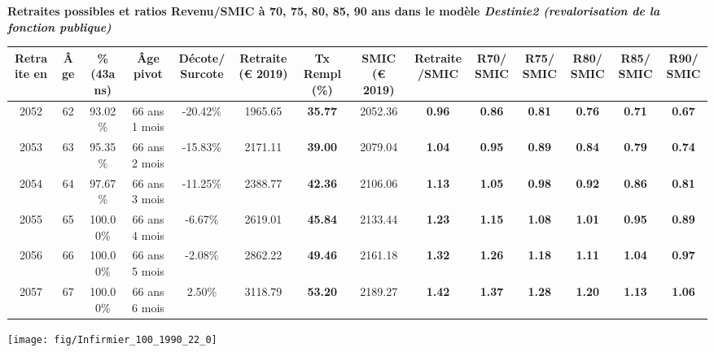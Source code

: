  \vspace{0.1cm} 
{\bf \noindent Retraites possibles et ratios Revenu/SMIC à 70, 75, 80, 85, 90 ans dans le modèle \emph{Destinie2 (revalorisation de la fonction publique)}}  
 
\begin{adjustbox}{max width=\textwidth} 
\begin{tabular}[htb]{|c|c||c|c|c||c|c||c|c||c|c|c|c|c|} 
\hline 
 Retraite en &  Âge &  \%(43ans) &  Âge pivot &  Décote/Surcote &  Retraite (\euro{} 2019) &  Tx Rempl(\%) &  SMIC (\euro{} 2019) &  Retraite/SMIC &  R70/SMIC &  R75/SMIC &  R80/SMIC &  R85/SMIC &  R90/SMIC \\ 
\hline \hline 
 2052 &  62 &  93.02\% &  66 ans 1 mois &  -20.42\% &  1965.65 &  {\bf 35.77} &  2052.36 &  {\bf {\color{red} 0.96}} &  {\bf {\color{red} 0.86}} &  {\bf {\color{red} 0.81}} &  {\bf {\color{red} 0.76}} &  {\bf {\color{red} 0.71}} &  {\bf {\color{red} 0.67}} \\ 
\hline 
 2053 &  63 &  95.35\% &  66 ans 2 mois &  -15.83\% &  2171.11 &  {\bf 39.00} &  2079.04 &  {\bf 1.04} &  {\bf {\color{red} 0.95}} &  {\bf {\color{red} 0.89}} &  {\bf {\color{red} 0.84}} &  {\bf {\color{red} 0.79}} &  {\bf {\color{red} 0.74}} \\ 
\hline 
 2054 &  64 &  97.67\% &  66 ans 3 mois &  -11.25\% &  2388.77 &  {\bf 42.36} &  2106.06 &  {\bf 1.13} &  {\bf 1.05} &  {\bf {\color{red} 0.98}} &  {\bf {\color{red} 0.92}} &  {\bf {\color{red} 0.86}} &  {\bf {\color{red} 0.81}} \\ 
\hline 
 2055 &  65 &  100.00\% &  66 ans 4 mois &  -6.67\% &  2619.01 &  {\bf 45.84} &  2133.44 &  {\bf 1.23} &  {\bf 1.15} &  {\bf 1.08} &  {\bf 1.01} &  {\bf {\color{red} 0.95}} &  {\bf {\color{red} 0.89}} \\ 
\hline 
 2056 &  66 &  100.00\% &  66 ans 5 mois &  -2.08\% &  2862.22 &  {\bf 49.46} &  2161.18 &  {\bf 1.32} &  {\bf 1.26} &  {\bf 1.18} &  {\bf 1.11} &  {\bf 1.04} &  {\bf {\color{red} 0.97}} \\ 
\hline 
 2057 &  67 &  100.00\% &  66 ans 6 mois &  2.50\% &  3118.79 &  {\bf 53.20} &  2189.27 &  {\bf 1.42} &  {\bf 1.37} &  {\bf 1.28} &  {\bf 1.20} &  {\bf 1.13} &  {\bf 1.06} \\ 
\hline 
\hline 
\end{tabular} 
\end{adjustbox} 
 
 \vspace{0.1cm} 

 {\hspace{-2.2cm}\texttt{[image: fig/Infirmier\_100\_1990\_22\_0]}} 

